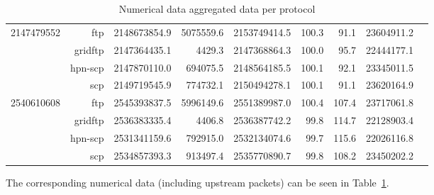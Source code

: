 \documentclass{sig-alternate-05-2015}
\begin{document}
\begin{table}
\begin{tabular}{lrlrrrrrr}
	\midrule
	2147479552 &      ftp & 2148673854.9 & 5075559.6 & 2153749414.5 &      100.3 &      91.1 &       23604911.2 \\
	           &  gridftp & 2147364435.1 &    4429.3 & 2147368864.3 &      100.0 &      95.7 &       22444177.1 \\
	           &  hpn-scp & 2147870110.0 &  694075.5 & 2148564185.5 &      100.1 &      92.1 &       23345011.5 \\
	           &      scp & 2149719545.9 &  774732.1 & 2150494278.1 &      100.1 &      91.1 &       23620164.9 \\
	\midrule
	2540610608 &      ftp & 2545393837.5 & 5996149.6 & 2551389987.0 &      100.4 &     107.4 &       23717061.8 \\
	           &  gridftp & 2536383335.4 &    4406.8 & 2536387742.2 &       99.8 &     114.7 &       22128903.4 \\
	           &  hpn-scp & 2531341159.6 &  792915.0 & 2532134074.6 &       99.7 &     115.6 &       22026116.8 \\
	           &      scp & 2534857393.3 &  913497.4 & 2535770890.7 &       99.8 &     108.2 &       23450202.2 \\
	\bottomrule
	\end{tabular}
\caption{Numerical data aggregated data per protocol}
\label{tab:aggregate}
\end{table}

The corresponding numerical data (including upstream packets) can be seen in Table~\ref{tab:aggregate}.
\end{document}
